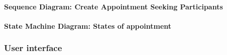 	\paragraph{Sequence Diagram: Create Appointment Seeking Participants} 
	\pagebreak

	\paragraph{State Machine Diagram: States of appointment}
\subsubsection{User interface}

\